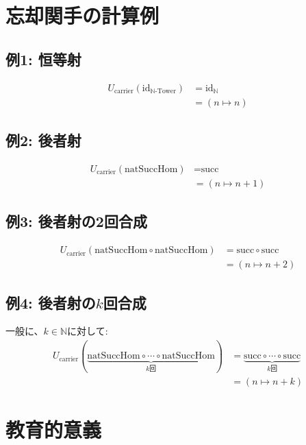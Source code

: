 \documentclass[a4paper,12pt]{article}
\theoremstyle{definition}
\begin{document}
\section{忘却関手の計算例}

\subsection{例1: 恒等射}

\begin{align*}
U_{\text{carrier}}(\text{id}_{\mathbb{N}\text{-Tower}}) &= \text{id}_{\mathbb{N}} \\
&= (n \mapsto n)
\end{align*}

\subsection{例2: 後者射}

\begin{align*}
U_{\text{carrier}}(\text{natSuccHom}) &= \text{succ} \\
&= (n \mapsto n + 1)
\end{align*}

\subsection{例3: 後者射の2回合成}

\begin{align*}
U_{\text{carrier}}(\text{natSuccHom} \circ \text{natSuccHom}) &= \text{succ} \circ \text{succ} \\
&= (n \mapsto n + 2)
\end{align*}

\subsection{例4: 後者射の$k$回合成}

一般に、$k \in \mathbb{N}$に対して:
\begin{align*}
U_{\text{carrier}}(\underbrace{\text{natSuccHom} \circ \cdots \circ \text{natSuccHom}}_{k\text{回}}) &= \underbrace{\text{succ} \circ \cdots \circ \text{succ}}_{k\text{回}} \\
&= (n \mapsto n + k)
\end{align*}

\section{教育的意義}
\end{document}
